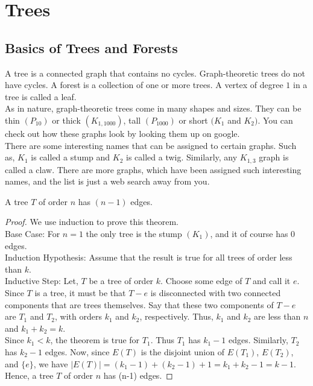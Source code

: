 \documentclass[../basic_graph_theory.tex]{subfiles}
\begin{document}
\chapter{Trees}
\setcounter{chapter}{3} %
\setcounter{section}{0}
\setcounter{equation}{0}
\setcounter{figure}{0}

\section{Basics of Trees and Forests}
A tree is a connected graph that contains no cycles. Graph-theoretic trees do not have cycles. A forest is a collection of one or more trees. A vertex of degree $1$ in a tree is called a leaf.\\
As in nature, graph-theoretic trees come in many shapes and sizes. They can be thin $(P_{10})$ or thick $(K_{1,1000})$, tall $(P_{1000})$ or short $(K_{1}$ and $K_{2})$. You can check out how these graphs look by looking them up on google.\\
There are some interesting names that can be assigned to certain graphs. Such as, $K_{1}$ is called a stump and $K_{2}$ is called a twig. Similarly, any $K_{1,3}$ graph is called a claw. There are more graphs, which have been assigned such interesting names, and the list is just a web search away from you.
\begin{Thm}{}{}
    A tree $T$ of order $n$ has $(n-1)$ edges.
\end{Thm}{}{}
\begin{proof}
    We use induction to prove this theorem.\\
    Base Case: For $n=1$ the only tree is the stump $(K_{1})$, and it of course has $0$ edges.\\
    Induction Hypothesis:  Assume that the result is true for all trees of order less than $k$.\\
    Inductive Step: Let, $T$ be a tree of order $k$. Choose some edge of $T$ and call it $e$. Since $T$ is a tree, it must be that $T-e$ is disconnected with two connected components that are trees themselves. Say that these two components of $T-e$ are $T_{1}$ and $T_{2}$, with orders $k_{1}$ and $k_{2}$, respectively. Thus, $k_{1}$ and $k_{2}$ are less than $n$ and $k_{1} + k_{2} = k$.\\
    Since $k_{1} < k$, the theorem is true for $T_{1}$. Thus $T_{1}$ has $k_{1}-1$ edges. Similarly, $T_{2}$ has $k_{2}-1$ edges. Now, since $E(T)$ is the disjoint union of $E(T_1)$, $E(T_2)$, and $\{e\}$, we have $|E(T)|=(k_{1}-1) + (k_{2}-1) + 1 = k_{1} + k_{2} - 1 = k-1$.\\
    Hence, a tree $T$ of order $n$ has (n-1) edges.
\end{proof}
\end{document}

